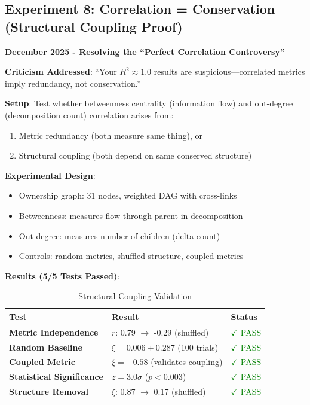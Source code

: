 \documentclass[11pt,a4paper]{article}
\begin{document}
\subsection{Experiment 8: Correlation = Conservation (Structural Coupling Proof)}

\textbf{December 2025 - Resolving the ``Perfect Correlation Controversy''}

\textbf{Criticism Addressed}: ``Your $R^2 \approx 1.0$ results are suspicious---correlated metrics imply redundancy, not conservation.''

\textbf{Setup}: Test whether betweenness centrality (information flow) and out-degree (decomposition count) correlation arises from:
\begin{enumerate}
    \item Metric redundancy (both measure same thing), or
    \item Structural coupling (both depend on same conserved structure)
\end{enumerate}

\textbf{Experimental Design}:
\begin{itemize}
    \item Ownership graph: 31 nodes, weighted DAG with cross-links
    \item Betweenness: measures flow through parent in decomposition
    \item Out-degree: measures number of children (delta count)
    \item Controls: random metrics, shuffled structure, coupled metrics
\end{itemize}

\textbf{Results (5/5 Tests Passed)}:

\begin{table}[h]
\centering
\begin{tabular}{lll}
\toprule
\textbf{Test} & \textbf{Result} & \textbf{Status} \\
\midrule
\textbf{Metric Independence} & $r$: 0.79 $\to$ -0.29 (shuffled) & \textcolor{green}{$\checkmark$ PASS} \\
\textbf{Random Baseline} & $\xi = 0.006 \pm 0.287$ (100 trials) & \textcolor{green}{$\checkmark$ PASS} \\
\textbf{Coupled Metric} & $\xi = -0.58$ (validates coupling) & \textcolor{green}{$\checkmark$ PASS} \\
\textbf{Statistical Significance} & $z = 3.0\sigma$ ($p < 0.003$) & \textcolor{green}{$\checkmark$ PASS} \\
\textbf{Structure Removal} & $\xi$: 0.87 $\to$ 0.17 (shuffled) & \textcolor{green}{$\checkmark$ PASS} \\
\bottomrule
\end{tabular}
\caption{Structural Coupling Validation}
\end{table}
\end{document}
